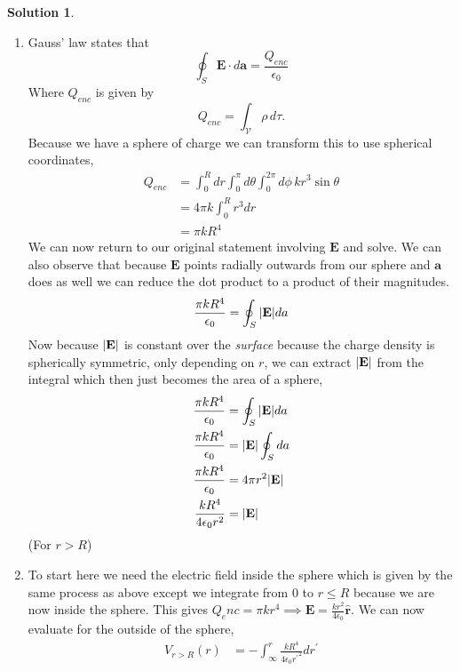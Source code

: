 \documentclass[10pt]{article}
\theoremstyle{definition}
\newtheorem{soln}{Solution}
\newcommand{\primed}[1]{#1^\prime}
\begin{document}
\begin{soln}~
  \begin{enumerate}[label=(\roman*)]
    \item Gauss' law states that
          $$\oint_S \mathbf{E}\cdot d\mathbf{a}=\frac{Q_{enc}}{\epsilon_0}$$
          Where $Q_{enc}$ is given by
          $$Q_{enc}=\int_\mathcal{V}\rho \,d\tau.$$
          Because we have a sphere of charge we can transform this to use spherical coordinates,
          \begin{align*}
            Q_{enc} & =\int_0^R dr \int_0^{\pi} d\theta \int_0^{2\pi}d\phi\,kr^3\sin\theta \\
                    & =4\pi k\int_0^R r^3 dr                                               \\
                    & =\pi kR^4
          \end{align*}
          We can now return to our original statement involving $\mathbf{E}$ and solve. We can also observe that because
          $\mathbf{E}$ points radially outwards from our sphere and $\mathbf{a}$ does as well we can reduce the dot product to a product of their magnitudes.
          $$
            \frac{\pi kR^4}{\epsilon_0}= \oint_S \abs{\mathbf{E}} da
          $$
          Now because $\abs{\mathbf{E}}$ is constant over the \emph{surface} because the charge density is spherically symmetric, only depending on $r$,
          we can extract $\abs{\mathbf{E}}$ from the integral which then just becomes the area of a sphere,
          \begin{align*}
            \frac{\pi kR^4}{\epsilon_0}  & = \oint_S \abs{\mathbf{E}} da  \\
            \frac{\pi kR^4}{\epsilon_0}  & = \abs{\mathbf{E}} \oint_S  da \\
            \frac{\pi kR^4}{\epsilon_0}  & = 4\pi r^2 \abs{\mathbf{E}}    \\
            \frac{kR^4}{4\epsilon_0 r^2} & = \abs{\mathbf{E}}             \\
          \end{align*}
          (For $r>R$)
    \item To start here we need the electric field inside the sphere which is given by the same process as above except we integrate from $0$ to $r\leq R$
          because we are now inside the sphere. This gives $Q_enc=\pi kr^4\implies \mathbf{E}=\frac{kr^2}{4\epsilon_0}\hat{\mathbf{r}}$. We can now evaluate for the outside of the sphere,
          \begin{align*}
            V_{r>R}(r) & =-\int_\infty^r\frac{kR^4}{4\epsilon_0 {\primed{r}}^2}d\primed{r}                             \\

\end{align*}
\end{enumerate}
\end{soln}
\end{document}
